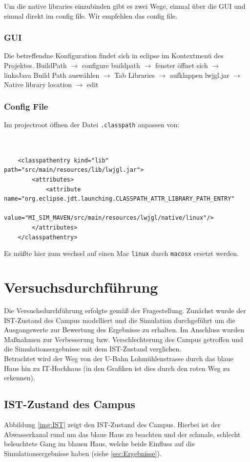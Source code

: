 \documentclass[10pt]{scrartcl}
\begin{document}
Um die native libraries einzubinden gibt es zwei Wege, einmal über die GUI und einmal direkt im config file. Wir empfehlen das config file.

\subsubsection{GUI}
Die betreffendne Konfiguration findet sich in eclipse im Kontextmenü des Projektes. BuildPath $\rightarrow$ configure buildpath $\rightarrow$ fenster öffnet sich $\rightarrow$ linksJava Build Path auswählen $\rightarrow$ Tab Libraries $\rightarrow$ aufklappen lwjgl.jar $\rightarrow$ Native library location $\rightarrow$ edit

\subsubsection{Config File}
Im projectroot öffnen der Datei \verb!.classpath! anpassen von:\begin{verbatim}


	<classpathentry kind="lib" path="src/main/resources/lib/lwjgl.jar">
		<attributes>
			<attribute name="org.eclipse.jdt.launching.CLASSPATH_ATTR_LIBRARY_PATH_ENTRY" 
			value="MI_SIM_MAVEN/src/main/resources/lwjgl/native/linux"/>
		</attributes>
	</classpathentry> 
\end{verbatim}

Es müßte hier zum wechsel auf einen Mac \verb!linux! durch \verb!macosx! ersetzt werden.

\section{Versuchsdurchführung}
Die Versuchsdurchführung erfolgte gemäß der Fragestellung. Zunächst wurde der IST-Zustand des Campus modelliert und die Simulation durchgeführt um die Ausgangswerte zur Bewertung des Ergebnisse zu erhalten. Im Anschluss wurden Maßnahmen zur Verbesserung bzw. Verschlechterung des Campus getroffen und die Simulationsergebnisse mit dem IST-Zustand verglichen.\\
Betrachtet wird der Weg von der U-Bahn Lohmühlenstrasse durch das blaue Haus hin zu IT-Hochhaus (in den Grafiken ist dies durch den roten Weg zu erkennen).

\subsection{IST-Zustand des Campus}
Abbildung \ref{img:IST} zeigt den IST-Zustand des Campus. Hierbei ist der Abwasserkanal rund um das blaue Haus zu beachten und der schmale, schlecht beleuchtete Gang im blauen Haus, welche beide Einfluss auf die Simulationsergebnisse haben (siehe \ref{sec:Ergebnisse}).
\end{document}
